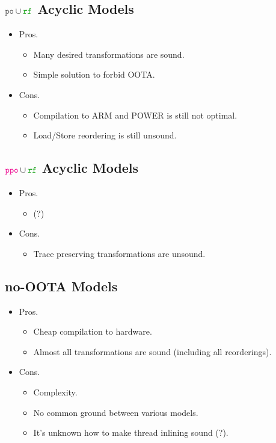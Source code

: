 \subsection{$\lPO\cup\lRF$ Acyclic Models}

\begin{itemize}
  \item Pros.
  \begin{itemize}
    \item Many desired transformations are sound. 
    \item Simple solution to forbid OOTA.
  \end{itemize}
  \item Cons.
  \begin{itemize}
    \item Compilation to ARM and POWER is still not optimal.
    \item Load/Store reordering is still unsound.
  \end{itemize}
\end{itemize}

\subsection{$\lPPO\cup\lRF$ Acyclic Models}

\begin{itemize}
  \item Pros.
  \begin{itemize}
    \item (?)
  \end{itemize}
  \item Cons.
  \begin{itemize}
    \item Trace preserving transformations are unsound.
  \end{itemize}
\end{itemize}

\subsection{no-OOTA Models}

\begin{itemize}
  \item Pros.
  \begin{itemize}
    \item Cheap compilation to hardware.
    \item Almost all transformations are sound (including all reorderings). 
  \end{itemize}
  \item Cons.
  \begin{itemize}
    \item Complexity.
    \item No common ground between various models.
    \item It's unknown how to make thread inlining sound (?).
  \end{itemize}
\end{itemize}

